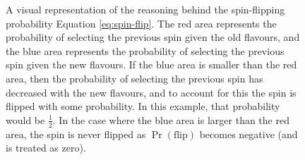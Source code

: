 \documentclass[12pt,a4paper]{report}
\begin{document}
\begin{figure}
  \centering
  \caption{A visual representation of the reasoning behind the spin-flipping probability Equation \eqref{eq:spin-flip}. The red area represents the probability of selecting the previous spin given the old flavours, and the blue area represents the probability of selecting the previous spin given the new flavours. If the blue area is smaller than the red area, then the probability of selecting the previous spin has decreased with the new flavours, and to account for this the spin is flipped with some probability. In this example, that probability would be $\frac{1}{2}$. In the case where the blue area is larger than the red area, the spin is never flipped as $\Pr(\text{flip})$ becomes negative (and is treated as zero).}
  \label{fig:spin-flip}
\end{figure}
\end{document}
